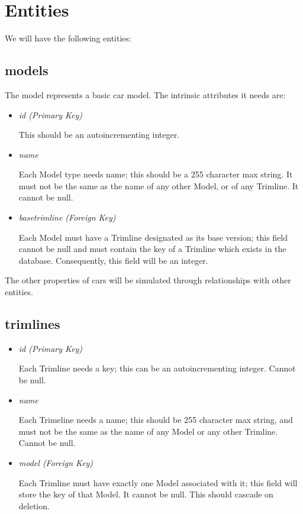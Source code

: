 \documentclass[11pt,letterpaper,oneside]{amsart}
\begin{document}
\section*{Entities}

We will have the following entities:

\subsection*{models}
The model represents a basic car model.  The intrinsic attributes it needs are:
\begin{itemize}
	\item \emph{id (Primary Key)}
	
	This should be an autoincrementing integer.
	
	\item \emph{name}
	
	Each Model type needs name; this should be a 255 character max string.  It must not be the same as the name of any other Model, or of any Trimline.  It cannot be null.
	
	\item \emph{base{\textunderscore}trimline (Foreign Key)}
	
	Each Model must have a Trimline designated as its base version; this field cannot be null and must contain the key of a Trimline which exists in the database.  Consequently, this field will be an integer.
	
	
\end{itemize}

The other properties of cars will be simulated through relationships with other entities.

\subsection*{trimlines}

\begin{itemize}
	\item \emph{id (Primary Key)}
	
	Each Trimline needs a key; this can be an autoincrementing integer. Cannot be null.
	
	\item \emph{name}
	
	Each Trimeline needs a name; this should be 255 character max string, and must not be the same as the name of any Model or any other Trimline.  Cannot be null.

	\item \emph{model (Foreign Key)}
	
	Each Trimline must have exactly one Model associated with it; this field will store the key of that Model.  It cannot be null.  This should cascade on deletion.
	

\end{itemize}
\end{document}

